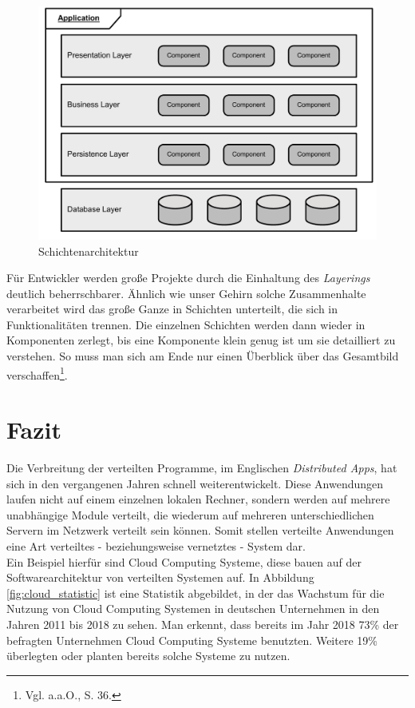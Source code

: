 \begin{figure}[H]
\centering
\includegraphics[width=\pictureWidth cm]{Bilder/Architektur/Schichtenarchitektur.pdf}
\caption{Schichtenarchitektur\label{fig:schichten}\protect\footnotemark}
\end{figure}

Für Entwickler werden große Projekte durch die Einhaltung des \textit{Layerings} deutlich beherrschbarer. Ähnlich wie unser Gehirn solche Zusammenhalte verarbeitet wird das große Ganze in Schichten unterteilt, die sich in Funktionalitäten trennen. Die einzelnen Schichten werden dann wieder in Komponenten zerlegt, bis eine Komponente klein genug ist um sie detailliert zu verstehen. So muss man sich am Ende nur einen Überblick über das Gesamtbild verschaffen\footnote{Vgl. a.a.O., S. 36.}.

\section{Fazit\label{sec:archfazit}}
Die Verbreitung der verteilten Programme, im Englischen \textit{Distributed \acp{App}}, hat sich in den vergangenen Jahren schnell weiterentwickelt. Diese Anwendungen laufen nicht auf einem einzelnen lokalen Rechner, sondern werden auf mehrere unabhängige Module verteilt, die wiederum auf mehreren unterschiedlichen Servern im Netzwerk verteilt sein können. Somit stellen verteilte Anwendungen eine Art verteiltes - beziehungsweise vernetztes - System dar\autocite[Vgl.][3\psq]{verteiltesys}. 
\\
\linebreak
Ein Beispiel hierfür sind Cloud Computing Systeme, diese bauen auf der Softwarearchitektur von verteilten Systemen auf. In Abbildung \ref{fig:cloud_statistic} ist eine Statistik abgebildet, in der das Wachstum für die Nutzung von Cloud Computing Systemen in deutschen Unternehmen in den Jahren 2011 bis 2018 zu sehen. Man erkennt, dass bereits im Jahr 2018 73\% der befragten Unternehmen Cloud Computing Systeme benutzten. Weitere 19\% überlegten oder planten bereits solche Systeme zu nutzen\autocite{cloudstatista}.

